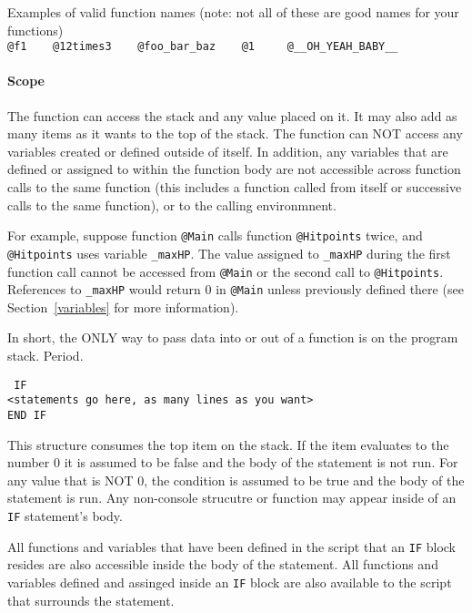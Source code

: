 \noindent%
Examples of valid function names (note: not all of these are good names for
your functions)\\
\texttt{@f1 \ \ \  @12times3 \ \ \  @foo\_bar\_baz \ \ \ @1 \ \ \ %
@\_\_OH\_YEAH\_BABY\_\_}

\paragraph*{Scope\\}
\hspace*{\parindent}The function can access the stack and any value placed on
it. It may also
add as many items as it wants to the top of the stack. The function
can NOT access any variables created or defined outside of itself. In addition,
any variables that are defined or assigned to within the function body are not
accessible across function calls to the same function
(this includes a function called from itself or successive calls to the
same function), or to the calling environmnent.

For example, suppose function \texttt{@Main} calls function \texttt{@Hitpoints}
twice, and \texttt{@Hitpoints} uses variable \texttt{\_maxHP}. The value
assigned to \texttt{\_maxHP} during the first function call cannot be accessed
from \texttt{@Main} or the second call to \texttt{@Hitpoints}.
References to \texttt{\_maxHP} would return 0 in \texttt{@Main} unless
previously defined there (see Section~\ref{variables} for more information).

In short, the ONLY way to pass data into or out of a function is on the program
stack. Period.

\breakline

\noindent\texttt{%
IF\\
<statements go here, as many lines as you want>\\
END IF}

This structure consumes the top item on the stack. If the item evaluates to the
number 0 it is assumed to be false and the body of the statement is not run.
For any value that is NOT 0, the condition is assumed to be true and the body
of the statement is run. Any non-console strucutre or function may appear
inside of an \texttt{IF} statement's body.

All functions and variables that have been defined in the script that an
\texttt{IF} block resides are also accessible inside the body of the statement.
All functions and variables defined and assinged inside an \texttt{IF} block
are also available to the script that surrounds the statement.

